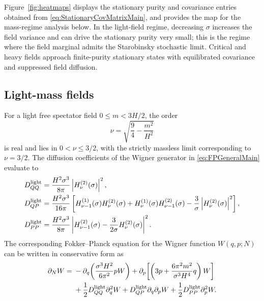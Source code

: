 \documentclass{article}
\numberwithin{equation}{section}
\begin{document}
Figure~\ref{fig:heatmaps} displays the stationary purity and covariance entries obtained from \cref{eq:StationaryCovMatrixMain}, and provides the map for the mass-regime analysis below. In the light-field regime, decreasing \(\sigma\) increases the field variance and can drive the stationary purity very small; this is the regime where the field marginal admits the Starobinsky stochastic limit. Critical and heavy fields approach finite-purity stationary states with equilibrated covariance and suppressed field diffusion.


\subsection{Light-mass fields}
\label{sec:light_mass_limit}

For a light free spectator field \(0\leq m<3H/2\), the order
\begin{equation}
    \nu=\sqrt{\frac94-\frac{m^2}{H^2}}
\end{equation}
is real and lies in \(0<\nu\leq 3/2\), with the strictly massless limit corresponding to \(\nu=3/2\). The diffusion coefficients of the Wigner generator in \cref{eq:FPGeneralMain} evaluate to
\begin{align}
    D_{QQ}^{\rm light}
    &=
    \frac{H^2\sigma^3}{8\pi}
    \left|H_\nu^{(2)}(\sigma)\right|^2 ,
    \label{eq:DQQLightMain}
    \\
    D_{QP}^{\rm light}
    &=
    \frac{H^2\sigma^3}{16\pi}
    \left[
    H_{\nu-1}^{(1)}(\sigma)H_\nu^{(2)}(\sigma)
    +
    H_\nu^{(1)}(\sigma)H_{\nu-1}^{(2)}(\sigma)
    -
    \frac{3}{\sigma}\left|H_\nu^{(2)}(\sigma)\right|^2
    \right],
    \label{eq:DQPLightMain}
    \\
    D_{PP}^{\rm light}
    &=
    \frac{H^2\sigma^3}{8\pi}
    \left|
    H_{\nu-1}^{(2)}(\sigma)
    -
    \frac{3}{2\sigma}H_\nu^{(2)}(\sigma)
    \right|^2 .
    \label{eq:DPPLightMain}
\end{align}
The corresponding Fokker--Planck equation for the Wigner function \(W(q,p;N)\) can be written in conservative form as
\begin{align}
    \partial_N W
    ={}&
    -\partial_q\!\left(
    \frac{\sigma^3H^2}{6\pi^2}pW
    \right)
    +
    \partial_p\!\left[
    \left(
    3p+\frac{6\pi^2m^2}{\sigma^3H^4}q
    \right)W
    \right]
    \nonumber
    \\
    &+
    \frac12D_{QQ}^{\rm light}\partial_q^2W
    +
    D_{QP}^{\rm light}\partial_q\partial_pW
    +
    \frac12D_{PP}^{\rm light}\partial_p^2W .
    \label{eq:FPLightConservativeMain}
\end{align}
\end{document}
